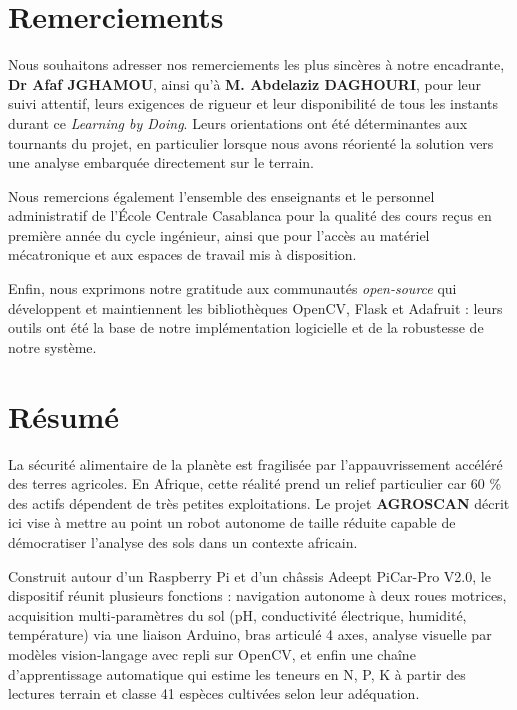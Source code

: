 \documentclass[a4paper,12pt,openany,titlepage]{scrartcl}
\begin{document}
\tableofcontents
\newpage

\section{Remerciements}

Nous souhaitons adresser nos remerciements les plus sincères à notre encadrante, \textbf{Dr Afaf JGHAMOU}, ainsi qu'à \textbf{M. Abdelaziz DAGHOURI}, pour leur suivi attentif, leurs exigences de rigueur et leur disponibilité de tous les instants durant ce \textit{Learning by Doing}. Leurs orientations ont été déterminantes aux tournants du projet, en particulier lorsque nous avons réorienté la solution vers une analyse embarquée directement sur le terrain.

Nous remercions également l’ensemble des enseignants et le personnel administratif de l’École Centrale Casablanca pour la qualité des cours reçus en première année du cycle ingénieur, ainsi que pour l’accès au matériel mécatronique et aux espaces de travail mis à disposition.

Enfin, nous exprimons notre gratitude aux communautés \textit{open-source} qui développent et maintiennent les bibliothèques OpenCV, Flask et Adafruit : leurs outils ont été la base de notre implémentation logicielle et de la robustesse de notre système.

\newpage

\section{R\'esum\'e}

La sécurité alimentaire de la planète est fragilisée par l’appauvrissement accéléré des terres agricoles. En Afrique, cette réalité prend un relief particulier car 60 \% des actifs dépendent de très petites exploitations. Le projet \textbf{AGROSCAN} décrit ici vise à mettre au point un robot autonome de taille réduite capable de démocratiser l’analyse des sols dans un contexte africain.

Construit autour d’un Raspberry Pi et d’un châssis Adeept PiCar-Pro V2.0, le dispositif réunit plusieurs fonctions : navigation autonome à deux roues motrices, acquisition multi‑paramètres du sol (pH, conductivité électrique, humidité, température) via une liaison Arduino, bras articulé 4 axes, analyse visuelle par modèles vision‑langage avec repli sur OpenCV, et enfin une chaîne d’apprentissage automatique qui estime les teneurs en N, P, K à partir des lectures terrain et classe 41 espèces cultivées selon leur adéquation.
\end{document}
